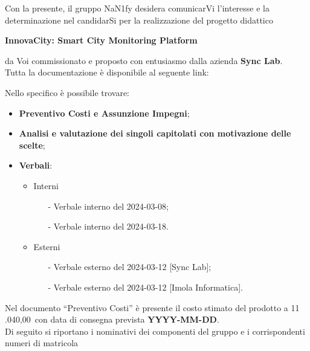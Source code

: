 Con la presente, il gruppo NaN1fy desidera comunicarVi l'interesse e la determinazione nel candidarSi per la realizzazione del progetto didattico \\
\begin{center}
	\textbf{InnovaCity: Smart City Monitoring Platform}
\end{center}
da Voi commissionato e proposto con entusiasmo dalla azienda \textbf{Sync Lab}.
\vspace{1em}
\\Tutta la documentazione è disponibile al seguente link: 
\begin{center}
	\textbf{\href{https://github.com/NaN1fy/docs/tree/main/documents/candidatura}{\color{myblue}{https://github.com/NaN1fy/docs/tree/main/documents/candidatura}}}
\end{center}
Nello specifico è possibile trovare:
\begin{itemize}
	\item \textbf{Preventivo Costi e Assunzione Impegni};
	\item \textbf{Analisi e valutazione dei singoli capitolati con motivazione delle scelte};
	\item \textbf{Verbali}: 
		\begin{itemize}
			\item Interni 
				\begin{itemize}
					\item[-] Verbale interno del 2024-03-08;
					\item[-] Verbale interno del 2024-03-18.
				\end{itemize}
			\item Esterni
				\begin{itemize}
					\item[-] Verbale esterno del 2024-03-12 [Sync Lab];
					\item[-] Verbale esterno del 2024-03-12 [Imola Informatica].
				\end{itemize}
		\end{itemize}
\end{itemize}
\vspace{1em}
Nel documento “Preventivo Costi” è presente il costo stimato del prodotto a 11 .040,00\;\texteuro\ con data di consegna prevista \textbf{YYYY-MM-DD}.\\
\vspace{1em}
Di seguito si riportano i nominativi dei componenti del gruppo e i corrispondenti numeri di matricola\\
